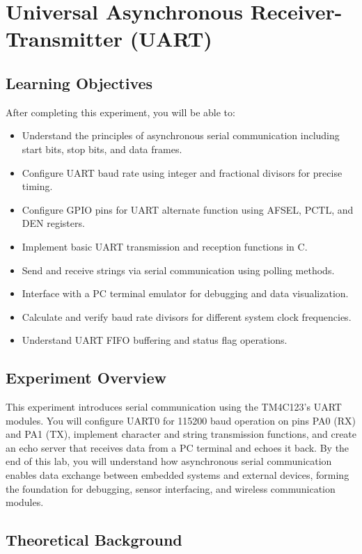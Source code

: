 \chapter{Universal Asynchronous Receiver-Transmitter (UART)}

\section*{Learning Objectives}
After completing this experiment, you will be able to:
\begin{itemize}[nosep]
  \item Understand the principles of asynchronous serial communication including start bits, stop bits, and data frames.
  \item Configure UART baud rate using integer and fractional divisors for precise timing.
  \item Configure GPIO pins for UART alternate function using AFSEL, PCTL, and DEN registers.
  \item Implement basic UART transmission and reception functions in C.
  \item Send and receive strings via serial communication using polling methods.
  \item Interface with a PC terminal emulator for debugging and data visualization.
  \item Calculate and verify baud rate divisors for different system clock frequencies.
  \item Understand UART FIFO buffering and status flag operations.
\end{itemize}

\section*{Experiment Overview}
This experiment introduces serial communication using the TM4C123's UART modules. You will configure UART0 for 115200 baud operation on pins PA0 (RX) and PA1 (TX), implement character and string transmission functions, and create an echo server that receives data from a PC terminal and echoes it back. By the end of this lab, you will understand how asynchronous serial communication enables data exchange between embedded systems and external devices, forming the foundation for debugging, sensor interfacing, and wireless communication modules.

\newpage


\section{Theoretical Background}

